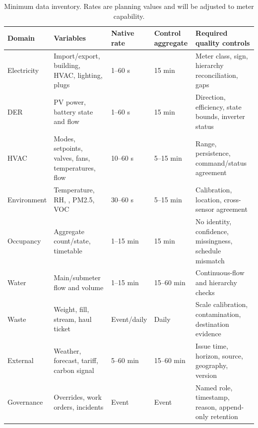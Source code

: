 \begin{table}[t]
	\centering
	\caption{Minimum data inventory. Rates are planning values and will be adjusted to meter capability.}
	\label{tab:data-inventory}
	\begin{tabularx}{\textwidth}{p{}p{}p{}p{}X}
		\toprule
		Domain      & Variables                                          & Native rate & Control aggregate & Required quality controls                               \\
		\midrule
		Electricity & Import/export, building, HVAC, lighting, plugs     & 1--60 s     & 15 min            & Meter class, sign, hierarchy reconciliation, gaps       \\
		DER         & PV power, battery state and flow                   & 1--60 s     & 15 min            & Direction, efficiency, state bounds, inverter status    \\
		HVAC        & Modes, setpoints, valves, fans, temperatures, flow & 10--60 s    & 5--15 min         & Range, persistence, command/status agreement            \\
		Environment & Temperature, RH, \COtwo{}, PM2.5, VOC              & 30--60 s    & 5--15 min         & Calibration, location, cross-sensor agreement           \\
		Occupancy   & Aggregate count/state, timetable                   & 1--15 min   & 15 min            & No identity, confidence, missingness, schedule mismatch \\
		Water       & Main/submeter flow and volume                      & 1--15 min   & 15--60 min        & Continuous-flow and hierarchy checks                    \\
		Waste       & Weight, fill, stream, haul ticket                  & Event/daily & Daily             & Scale calibration, contamination, destination evidence  \\
		External    & Weather, forecast, tariff, carbon signal           & 5--60 min   & 15--60 min        & Issue time, horizon, source, geography, version         \\
		Governance  & Overrides, work orders, incidents                  & Event       & Event             & Named role, timestamp, reason, append-only retention    \\
		\bottomrule
	\end{tabularx}
\end{table}
